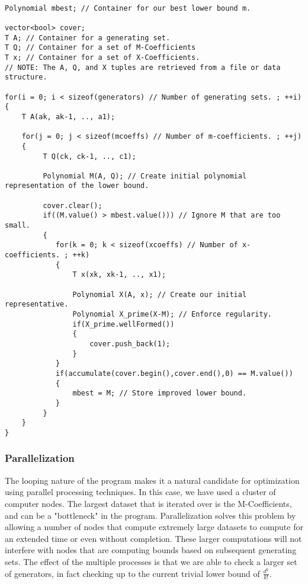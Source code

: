 \begin{lstlisting}

Polynomial mbest; // Container for our best lower bound m.

vector<bool> cover;
T A; // Container for a generating set.
T Q; // Container for a set of M-Coefficients
T x; // Container for a set of X-Coefficients.
// NOTE: The A, Q, and X tuples are retrieved from a file or data structure.

for(i = 0; i < sizeof(generators) // Number of generating sets. ; ++i)
{
    T A(ak, ak-1, .., a1);

    for(j = 0; j < sizeof(mcoeffs) // Number of m-coefficients. ; ++j)
    {
         T Q(ck, ck-1, .., c1); 
 
         Polynomial M(A, Q); // Create initial polynomial representation of the lower bound.
   
         cover.clear(); 
         if((M.value() > mbest.value())) // Ignore M that are too small.
         {
            for(k = 0; k < sizeof(xcoeffs) // Number of x-coefficients. ; ++k)
            {
                T x(xk, xk-1, .., x1);

                Polynomial X(A, x); // Create our initial representative.
                Polynomial X_prime(X-M); // Enforce regularity.
                if(X_prime.wellFormed())
                { 
                    cover.push_back(1);
                }
            }
            if(accumulate(cover.begin(),cover.end(),0) == M.value())
            {
                mbest = M; // Store improved lower bound.
            }
         }
    }
}

\end{lstlisting}

\subsubsection*{Parallelization}

The looping nature of the program makes it a natural candidate for optimization using parallel processing techniques. In this case, we have used a cluster of computer nodes. The largest dataset that is iterated over is the M-Coefficients, and can be a "bottleneck" in the program. Parallelization solves this problem by allowing a number of nodes that compute extremely large datasets to compute for an extended time or even without completion. These larger computations will not interfere with nodes that are computing bounds based on subsequent generating sets. The effect of the multiple processes is that we are able to check a larger set of generators, in fact checking up to the current trivial lower bound of $\frac{d^k}{k!}$.


